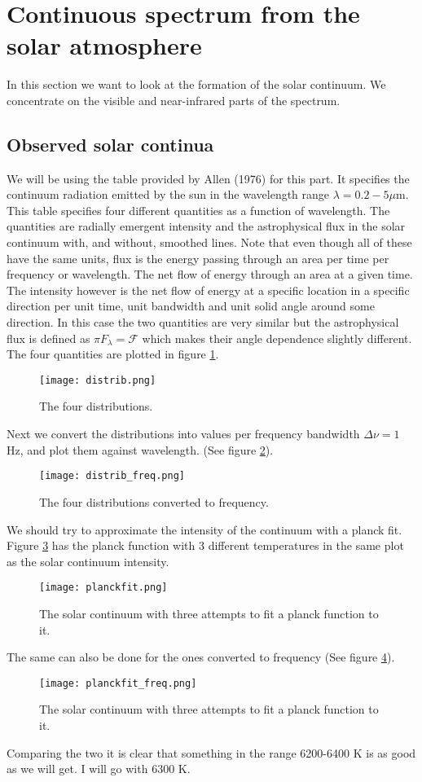\documentclass{aa}   %
\begin{document}
\section{Continuous spectrum from the solar atmosphere}
In this section we want to look at the formation of the solar continuum. We concentrate on the visible and near-infrared parts of the spectrum.
\subsection{Observed solar continua}
We will be using the table provided by Allen (1976) for this part. It specifies the continuum radiation emitted by the sun in the wavelength range $\lambda = 0.2 - 5\mu$m. This table specifies four different quantities as a function of wavelength. The quantities are radially emergent intensity and the astrophysical flux in the solar continuum with, and without, smoothed lines.
Note that even though all of these have the same units, flux is the energy passing through an area per time per frequency or wavelength. The net flow of energy through an area at a given time. The intensity however is the net flow of energy at a specific location in a specific direction per unit time, unit bandwidth and unit solid angle around some direction. In this case the two quantities are very similar but the astrophysical flux is defined as $\pi F_\lambda = \mathcal{F}$ which makes their angle dependence slightly different.
The four quantities are plotted in figure \ref{distrib}.
\begin{figure}
 \texttt{[image: distrib.png]}
 \caption{The four distributions.}
 \label{distrib} 
\end{figure}

Next we convert the distributions into values per frequency bandwidth $\Delta \nu = 1$ Hz, and plot them against wavelength. (See figure \ref{distrib_freq}).
\begin{figure}
 \texttt{[image: distrib\_freq.png]}
 \caption{The four distributions converted to frequency.}
 \label{distrib_freq} 
\end{figure}

We should try to approximate the intensity of the continuum with a planck fit.
Figure \ref{planckfit} has the planck function with 3 different temperatures in the same plot as the solar continuum intensity. 
\begin{figure}
 \texttt{[image: planckfit.png]}
 \caption{The solar continuum with three attempts to fit a planck function to it.}
 \label{planckfit} 
\end{figure}
The same can also be done for the ones converted to frequency (See figure \ref{planckfit_freq}).
\begin{figure}
 \texttt{[image: planckfit\_freq.png]}
 \caption{The solar continuum with three attempts to fit a planck function to it.}
 \label{planckfit_freq} 
\end{figure}
Comparing the two it is clear that something in the range 6200-6400 K is as good as we will get. I will go with 6300 K.
\end{document}
